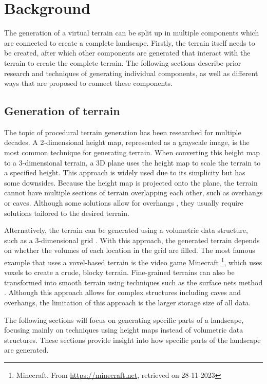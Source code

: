 \documentclass{article}
\begin{document}
\section{Background}
The generation of a virtual terrain can be split up in multiple components which are connected to create a complete landscape. Firstly, the terrain itself needs to be created, after which other components are generated that interact with the terrain to create the complete terrain. The following sections describe prior research and techniques of generating individual components, as well as different ways that are proposed to connect these components.

\subsection{Generation of terrain}
The topic of procedural terrain generation has been researched for multiple decades. A 2-dimensional height map, represented as a grayscale image, is the most common technique for generating terrain. When converting this height map to a 3-dimensional terrain, a 3D plane uses the height map to scale the terrain to a specified height. This approach is widely used due to its simplicity but has some downsides. Because the height map is projected onto the plane, the terrain cannot have multiple sections of terrain overlapping each other, such as overhangs or caves. Although some solutions allow for overhangs \cite{gamito_procedural_2003}, they usually require solutions tailored to the desired terrain.

Alternatively, the terrain can be generated using a volumetric data structure, such as a 3-dimensional grid \cite{dey_procedural_2018}. With this approach, the generated terrain depends on whether the volumes of each location in the grid are filled. The most famous example that uses a voxel-based terrain is the video game Minecraft \footnote{Minecraft. From \url{https://minecraft.net}, retrieved on 28-11-2023}, which uses voxels to create a crude, blocky terrain. Fine-grained terrains can also be transformed into smooth terrain using techniques such as the surface nets method \cite{gibson_constrained_1998}. Although this approach allows for complex structures including caves \cite{cui_voxel-based_2011} and overhangs, the limitation of this approach is the larger storage size of all data.

The following sections will focus on generating specific parts of a landscape, focusing mainly on techniques using height maps instead of volumetric data structures. These sections provide insight into how specific parts of the landscape are generated.
\end{document}
